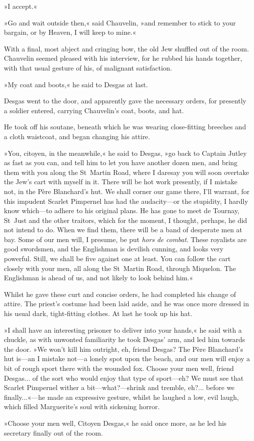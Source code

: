 »I accept.«

»Go and wait outside then,« said Chauvelin, »and remember to stick to your bargain, or by Heaven, I will keep to mine.«

With a final, most abject and cringing bow, the old Jew shuffled out of the room. Chauvelin seemed pleased with his interview, for he rubbed his hands together, with that usual gesture of his, of malignant satisfaction.

»My coat and boots,« he said to Desgas at last.

Desgas went to the door, and apparently gave the necessary orders, for presently a soldier entered, carrying Chauvelin's coat, boots, and hat.

He took off his soutane, beneath which he was wearing close-fitting breeches and a cloth waistcoat, and began changing his attire.

»You, citoyen, in the meanwhile,« he said to Desgas, »go back to Captain Jutley as fast as you can, and tell him to let you have another dozen men, and bring them with you along the St~Martin Road, where I daresay you will soon overtake the Jew's cart with myself in it. There will be hot work presently, if I mistake not, in the Père Blanchard's hut. We shall corner our game there, I'll warrant, for this impudent Scarlet Pimpernel has had the audacity\allowbreak---\allowbreak or the stupidity, I hardly know which\allowbreak---\allowbreak to adhere to his original plans. He has gone to meet de Tournay, St~Just and the other traitors, which for the moment, I thought, perhaps, he did not intend to do. When we find them, there will be a band of desperate men at bay. Some of our men will, I presume, be put \textit{hors de combat}. These royalists are good swordsmen, and the Englishman is devilish cunning, and looks very powerful. Still, we shall be five against one at least. You can follow the cart closely with your men, all along the St~Martin Road, through Miquelon. The Englishman is ahead of us, and not likely to look behind him.«

Whilst he gave these curt and concise orders, he had completed his change of attire. The priest's costume had been laid aside, and he was once more dressed in his usual dark, tight-fitting clothes. At last he took up his hat.

»I shall have an interesting prisoner to deliver into your hands,« he said with a chuckle, as with unwonted familiarity he took Desgas' arm, and led him towards the door. »We won't kill him outright, eh, friend Desgas? The Père Blanchard's hut is\allowbreak---\allowbreak an I mistake not\allowbreak---\allowbreak a lonely spot upon the beach, and our men will enjoy a bit of rough sport there with the wounded fox. Choose your men well, friend Desgas... of the sort who would enjoy that type of sport\allowbreak---\allowbreak eh? We must see that Scarlet Pimpernel wither a bit\allowbreak---\allowbreak what?\allowbreak---\allowbreak shrink and tremble, eh?... before we finally...«\allowbreak---\allowbreak he made an expressive gesture, whilst he laughed a low, evil laugh, which filled Marguerite's soul with sickening horror.

»Choose your men well, Citoyen Desgas,« he said once more, as he led his secretary finally out of the room.